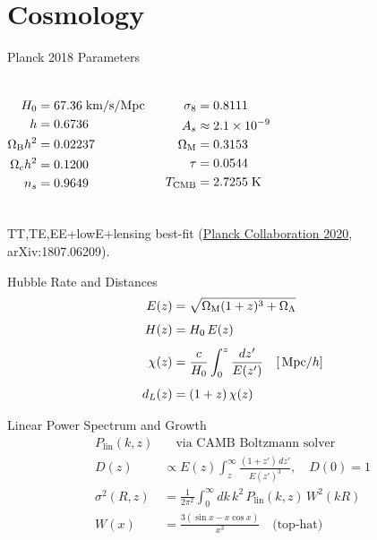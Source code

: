 \section{Cosmology}

\begin{frame}{Planck 2018 Parameters}
\begin{columns}[T]
\begin{align*}
H_0 &= 67.36\;\mathrm{km/s/Mpc} \\
h &= 0.6736 \\
\Omega_{\mathrm{B}} h^2 &= 0.02237 \\
\Omega_c h^2 &= 0.1200 \\
n_s &= 0.9649
\end{align*}

\begin{align*}
\sigma_8 &= 0.8111 \\
A_s &\approx 2.1\times10^{-9} \\
\Omega_{\mathrm{M}} &= 0.3153 \\
\tau &= 0.0544 \\
T_{\mathrm{CMB}} &= 2.7255\;\mathrm{K}
\end{align*}
\end{columns}
\vspace{0.4cm}
TT,TE,EE+lowE+lensing best-fit (\href{https://arxiv.org/abs/1807.06209}{Planck Collaboration 2020}, arXiv:1807.06209).
\end{frame}

\begin{frame}{Hubble Rate and Distances}
\begin{align}
E(z) &= \sqrt{\Omega_{\mathrm{M}}(1+z)^3 + \Omega_\Lambda} \\[4pt]
H(z) &= H_0\,E(z) \\[4pt]
\chi(z) &= \frac{c}{H_0}\int_0^z \frac{dz'}{E(z')} \quad [\,\mathrm{Mpc}/h] \\[4pt]
d_L(z) &= (1+z)\,\chi(z)
\end{align}

\end{frame}

\begin{frame}{Linear Power Spectrum and Growth}
\begin{align}
P_{\mathrm{lin}}(k,z) &\quad\text{via CAMB Boltzmann solver} \\[6pt]
D(z) &\propto E(z)\int_z^\infty \frac{(1+z')\,dz'}{E(z')^3}, \quad D(0)=1 \\[6pt]
\sigma^2(R,z) &= \frac{1}{2\pi^2}\int_0^\infty dk\,k^2\,P_{\mathrm{lin}}(k,z)\,W^2(kR) \\[4pt]
W(x) &= \frac{3(\sin x - x\cos x)}{x^3} \quad\text{(top-hat)}
\end{align}

\end{frame}
